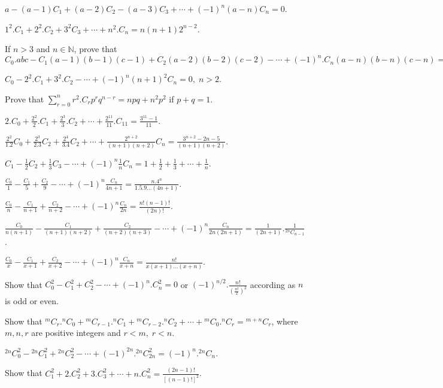 \item $a - (a - 1)C_1 + (a - 2)C_2 - (a - 3)C_3 + \cdots + (-1)^n(a - n)C_n = 0$.
\item $1^2.C_1 + 2^2.C_2 + 3^2C_3 + \cdots + n^2.C_n = n(n + 1)2^{n - 2}$.
\item If $n>3$ and $n\in\mathbb{N}$, prove that $C_0.abc - C_1(a - 1)(b - 1)(c - 1) + C_2(a - 2)(b - 2)(c -2)- \cdots +
  (-1)^n.C_n(a - n)(b - n)(c - n) = 0$
\item $C_0 - 2^2.C_1 + 3^2.C_2 - \cdots + (-1)^n(n + 1)^2C_n = 0,\;n>2$.
\item Prove that $\displaystyle\sum_{r=0}^nr^2.C_rp^rq^{n- r} = npq + n^2p^2$ if $p + q = 1$.
\item $2.C_0 + \frac{2^2}{2}.C_1 + \frac{2^3}{3}.C_2 + \cdots + \frac{2^{11}}{11}.C_{11} = \frac{3^{11} -
    1}{11}$.
\item $\frac{2^2}{1.2}C_0 + \frac{2^3}{2.3}C_2 + \frac{2^4}{3.4}C_2 + \cdots + \frac{2^{n + 2}}{(n + 1)(n +
    2)}C_n = \frac{3^{n + 2} - 2n -5}{(n + 1)(n + 2)}$.
\item $C_1 - \frac{1}{2}C_2 + \frac{1}{3}C_3 - \cdots + (-1)^n\frac{1}{n}C_n = 1 + \frac{1}{2} + \frac{1}{3} + \cdots +
  \frac{1}{n}$.
\item $\frac{C_0}{1} - \frac{C_1}{5} + \frac{C_2}{9} - \cdots + (-1)^n\frac{C_n}{4n + 1} = \frac{n.4^n}{1.5.9\ldots (4n + 1)}$.
\item $\frac{C_0}{n} - \frac{C_1}{n+ 1} + \frac{C_2}{n + 2} - \cdots + (-1)^n\frac{C_n}{2n} = \frac{n!(n - 1)!}{(2n)!}$.
\item $\frac{C_0}{n(n + 1)} - \frac{C_1}{(n + 1)(n+ 2)} + \frac{C_2}{(n + 2)(n + 3)} - \cdots + (-1)^n\frac{C_n}{2n(2n + 1)} =
  \frac{1}{(2n + 1)}.\frac{1}{{}^{2n}C_{n - 1}}$.
\item $\frac{C_0}{x} - \frac{C_1}{x + 1} + \frac{C_2}{x + 2} - \cdots + (-1)^n\frac{C_n}{x + n} = \frac{n!}{x(x + 1)\ldots(x + n)}$.
\item Show that $C_0^2 - C_1^2 + C_2^2 - \cdots + (-1)^n.C_n^2 = 0$ or $(-1)^{n/2}.\frac{n!}{\left(\frac{n!}{2}\right)^2}$
  according as $n$ is odd or even.
\item Show that ${}^mC_r.{}^nC_0 + {}^mC_{r-1}.{}^nC_1 + {}^mC_{r-2}.{}^nC_2 + \cdots + {}^mC_0.{}^nC_r = {}^{m + n}C_r$, where $m,
  n, r$ are positive integers and $r<m,\;r<n$.
\item ${}^{2n}C_0^2 - {}^{2n}C_1^2 + {}^{2n}C_2^2 - \cdots + (-1)^{2n}.{}^{2n}C_{2n}^2 = (-1)^n.{}^{2n}C_n$.
\item Show that $C_1^2 + 2.C_2^2 + 3.C_3^2 + \cdots + n.C_n^2 = \frac{(2n - 1)!}{[(n - 1)!]^2}$.
